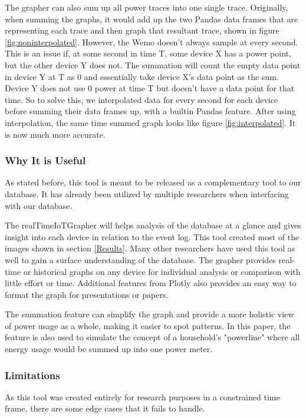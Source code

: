 The grapher can also sum up all power traces into one single trace. Originally, when summing the graphs, it would add up the two Pandas data frames that are representing each trace and then graph that resultant trace, shown in figure \ref{fig:noninterpolated}. However, the Wemo doesn't always sample at every second. This is an issue if, at some second in time T, some device X has a power point, but the other device Y does not. The summation will count the empty data point in device Y at T as 0 and essentially take device X's data point as the sum. Device Y does not use 0 power at time T but doesn't have a data point for that time. So to solve this, we interpolated data for every second for each device before summing their data frames up, with a builtin Pandas feature. After using interpolation, the same time summed graph looks like figure \ref{fig:interpolated}. It is now much more accurate.

\subsubsection{Why It is Useful}
As stated before, this tool is meant to be released as a complementary tool to our database. It has already been utilized by multiple researchers when interfacing with our database.

The realTimeIoTGrapher will helps analysis of the database at a glance and gives insight into each device in relation to the event log.  This tool created most of the images shown in section \ref{Results}. Many other researchers have used this tool as well to gain a surface understanding of the database. The grapher provides real-time or historical graphs on any device for individual analysis or comparison with little effort or time. Additional features from Plotly also provides an easy way to format the graph for presentations or papers.

The summation feature can simplify the graph and provide a more holistic view of power usage as a whole, making it easier to spot patterns. In this paper, the feature is also used to simulate the concept of a household's "powerline" where all energy usage would be summed up into one power meter.

\subsubsection{Limitations}
As this tool was created entirely for research purposes in a constrained time frame, there are some edge cases that it fails to handle.

